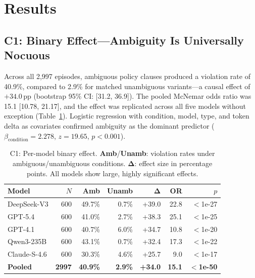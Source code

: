 \documentclass[11pt,a4paper]{article}
\newcommand{\pp}{\,\text{pp}}
\begin{document}
\section{Results}
\label{sec:results}

\subsection{C1: Binary Effect---Ambiguity Is Universally Nocuous}
\label{sec:c1}

Across all 2{,}997 episodes, ambiguous policy clauses produced a violation rate of 40.9\%, compared to 2.9\% for matched unambiguous variants---a causal effect of $+34.0\pp$ (bootstrap 95\% CI: [31.2, 36.9]).
The pooled McNemar odds ratio was 15.1 [10.78, 21.17], and the effect was replicated across all five models without exception (Table~\ref{tab:c1}).
Logistic regression with condition, model, type, and token delta as covariates confirmed ambiguity as the dominant predictor ($\beta_\text{condition} = 2.278$, $z = 19.65$, $p < 0.001$).

\begin{table}[t]
\centering
\small
\begin{tabular}{lrrrrrr}
\toprule
\textbf{Model} & $N$ & \textbf{Amb} & \textbf{Unamb} & $\boldsymbol{\Delta}$ & \textbf{OR} & $p$ \\
\midrule
DeepSeek-V3 & 600 & 49.7\% & 0.7\% & +39.0 & 22.8 & $<$\!1e-27 \\
GPT-5.4 & 600 & 41.0\% & 2.7\% & +38.3 & 25.1 & $<$\!1e-25 \\
GPT-4.1 & 600 & 40.7\% & 6.0\% & +34.7 & 10.8 & $<$\!1e-20 \\
Qwen3-235B & 600 & 43.1\% & 0.7\% & +32.4 & 17.3 & $<$\!1e-22 \\
Claude-S-4.6 & 600 & 30.3\% & 4.6\% & +25.7 & 9.0 & $<$\!1e-17 \\
\midrule
\textbf{Pooled} & \textbf{2997} & \textbf{40.9\%} & \textbf{2.9\%} & \textbf{+34.0} & \textbf{15.1} & $<$\!\textbf{1e-50} \\
\bottomrule
\end{tabular}
\caption{C1: Per-model binary effect. \textbf{Amb}/\textbf{Unamb}: violation rates under ambiguous/unambiguous conditions. $\boldsymbol{\Delta}$: effect size in percentage points. All models show large, highly significant effects.}
\label{tab:c1}
\end{table}
\end{document}
